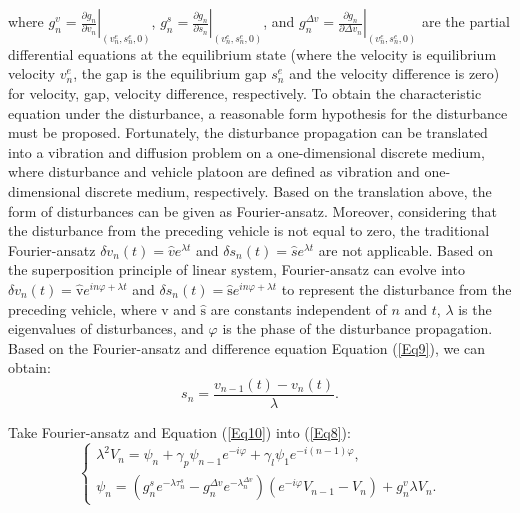 \documentclass[journal]{IEEEtran}
\begin{document}
where $g_{n}^{v}=\left.\frac{\partial g_{n}}{\partial v_{n}}\right|_{\left(v_{n}^{e}, s_{n}^{e}, 0\right)}$, $g_{n}^{s}=\left.\frac{\partial g_{n}}{\partial s_{n}}\right|_{\left(v_{n}^{e}, s_{n}^{e}, 0\right)}$, and $g_{n}^{\Delta v}=\left.\frac{\partial g_{n}}{\partial \Delta v_{n}}\right|_{\left(v_{n}^{e}, s_{n}^{e}, 0\right)}$ are the partial differential equations at the equilibrium state (where the velocity is equilibrium velocity $v_{n}^{e}$, the gap is the equilibrium gap $s_{n}^{e}$ and the velocity difference is zero) for velocity, gap, velocity difference, respectively. To obtain the characteristic equation under the disturbance, a reasonable form hypothesis for the disturbance must be proposed. Fortunately, the disturbance propagation can be translated into a vibration and diffusion problem on a one-dimensional discrete medium, where disturbance and vehicle platoon are defined as vibration and one-dimensional discrete medium, respectively. Based on the translation above, the form of disturbances can be given as Fourier-ansatz. Moreover, considering that the disturbance from the preceding vehicle is not equal to zero, the traditional Fourier-ansatz $\delta v_{n}(t)=\hat{v} e^{\lambda t}$ and $\delta s_{n}(t)=\hat{s} e^{\lambda t}$ are not applicable. Based on the superposition principle of linear system, Fourier-ansatz can evolve into $\delta v_{n}(t)=\hat{\mathrm{v}} e^{i n \varphi+\lambda t}$ and $\delta s_{n}(t)=\hat{\mathrm{s}} e^{i n \varphi+\lambda t}$ to represent the disturbance from the preceding vehicle, where $\hat{\mathrm{v}}$ and $\hat{\mathrm{s}}$ are constants independent of $n$ and $t$, $\lambda$ is the eigenvalues of disturbances, and $\varphi$ is the phase of the disturbance propagation. Based on the Fourier-ansatz and difference equation Equation (\ref{Eq9}), we can obtain:
\begin{equation}
  s_{n}=\frac{v_{n-1}(t)-v_{n}(t)}{\lambda}.
  \label{Eq10}
\end{equation}

Take Fourier-ansatz and Equation (\ref{Eq10}) into (\ref{Eq8}):
\begin{equation}
  \left\{\begin{array}{c}
    \lambda^{2}V_{n}=\psi_{n}+\gamma_{p} \psi_{n-1} e^{-i \varphi}+\gamma_{l} \psi_{1} e^{-i(n-1) \varphi}, \\
    \psi_{n}=\left(g_{n}^{s} e^{-\lambda \tau_{n}^{s}}-g_{n}^{\Delta v} e^{-\lambda_{n}^{\Delta v}}\right)\left(e^{-i \varphi}V_{n-1}-V_{n}\right)+g_{n}^{v} \lambda V_{n}.
  \end{array}\right.
  \label{Eq11}
\end{equation}
\end{document}
